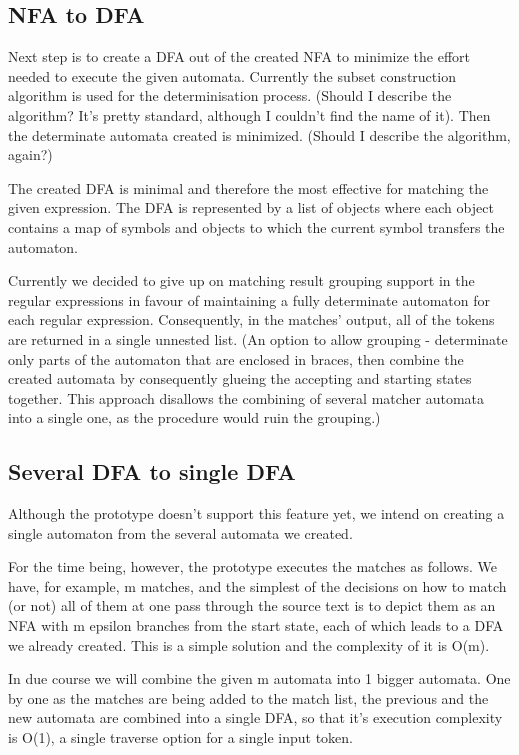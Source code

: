 \subsection{NFA to DFA}
Next step is to create a DFA out of the created NFA to minimize the effort needed to execute the given automata. Currently the subset construction algorithm is used for the determinisation process. (Should I describe the algorithm? It's pretty standard, although I couldn't find the name of it). Then the determinate automata created is minimized. (Should I describe the algorithm, again?)

The created DFA is minimal and therefore the most effective for matching the given expression. The DFA is represented by a list of objects where each object contains a map of symbols and objects to which the current symbol transfers the automaton.

Currently we decided to give up on matching result grouping support in the regular expressions in favour of maintaining a fully determinate automaton for each regular expression. Consequently, in the matches' output, all of the tokens are returned in a single unnested list. (An option to allow grouping - determinate only parts of the automaton that are enclosed in braces, then combine the created automata by consequently glueing the accepting and starting states together. This approach disallows the combining of several matcher automata into a single one, as the procedure would ruin the grouping.)

\subsection{Several DFA to single DFA}
Although the prototype doesn't support this feature yet, we intend on creating a single automaton from the several automata we created. 

For the time being, however, the prototype executes the matches as follows. We have, for example, m matches, and the simplest of the decisions on how to match (or not) all of them at one pass through the source text is to depict them as an NFA with m epsilon branches from the start state, each of which leads to a DFA we already created. This is a simple solution and the complexity of it is O(m).



In due course we will combine the given m automata into 1 bigger automata. One by one as the matches are being added to the match list, the previous and the new automata are combined into a single DFA, so that it's execution complexity is O(1), a single traverse option for a single input token.

